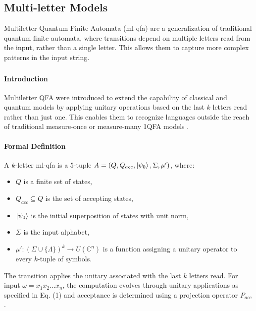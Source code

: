 \subsection{Multi-letter Models}
\label{sec:multi-letter-qfa}

Multiletter Quantum Finite Automata (\gls{ml-qfa}) are a generalization of traditional quantum finite automata, where transitions depend on multiple letters read from the input, rather than a single letter. This allows them to capture more complex patterns in the input string.

\subsubsection{}

\paragraph{Introduction}
Multiletter QFA were introduced to extend the capability of classical and quantum models by applying unitary operations based on the last $k$ letters read rather than just one. This enables them to recognize languages outside the reach of traditional measure-once or measure-many 1QFA models \cite{belovs2007multi}.

\paragraph{Formal Definition}
A $k$-letter \gls{ml-qfa} is a 5-tuple $A = (Q, Q_{acc}, \ket{\psi_0}, \Sigma, \mu')$, where:
\begin{itemize}
    \item $Q$ is a finite set of states,
    \item $Q_{acc} \subseteq Q$ is the set of accepting states,
    \item $\ket{\psi_0}$ is the initial superposition of states with unit norm,
    \item $\Sigma$ is the input alphabet,
    \item $\mu': (\Sigma \cup \{\Lambda\})^k \to U(\mathbb{C}^n)$ is a function assigning a unitary operator to every $k$-tuple of symbols.
\end{itemize}
The transition applies the unitary associated with the last $k$ letters read. For input $\omega = x_1 x_2 \dots x_n$, the computation evolves through unitary applications as specified in Eq. (1) and acceptance is determined using a projection operator $P_{acc}$ \cite{qiu2009hierarchy}.

